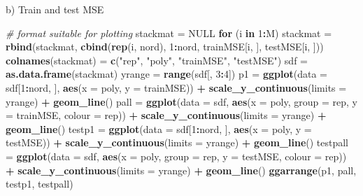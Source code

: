 \documentclass[ignorenonframetext,]{beamer}
\newenvironment{Shaded}{\begin{snugshade}}{\end{snugshade}}
\newcommand{\KeywordTok}[1]{\textcolor[rgb]{0.13,0.29,0.53}{\textbf{#1}}}
\newcommand{\DataTypeTok}[1]{\textcolor[rgb]{0.13,0.29,0.53}{#1}}
\newcommand{\DecValTok}[1]{\textcolor[rgb]{0.00,0.00,0.81}{#1}}
\newcommand{\StringTok}[1]{\textcolor[rgb]{0.31,0.60,0.02}{#1}}
\newcommand{\CommentTok}[1]{\textcolor[rgb]{0.56,0.35,0.01}{\textit{#1}}}
\newcommand{\OtherTok}[1]{\textcolor[rgb]{0.56,0.35,0.01}{#1}}
\newcommand{\ControlFlowTok}[1]{\textcolor[rgb]{0.13,0.29,0.53}{\textbf{#1}}}
\newcommand{\OperatorTok}[1]{\textcolor[rgb]{0.81,0.36,0.00}{\textbf{#1}}}
\newcommand{\NormalTok}[1]{#1}
\begin{document}
\begin{frame}[fragile]
\begin{block}{b) Train and test MSE}
\begin{Shaded}
\begin{Highlighting}[]
\CommentTok{# format suitable for plotting}
\NormalTok{stackmat =}\StringTok{ }\OtherTok{NULL}
\ControlFlowTok{for}\NormalTok{ (i }\ControlFlowTok{in} \DecValTok{1}\OperatorTok{:}\NormalTok{M) stackmat =}\StringTok{ }\KeywordTok{rbind}\NormalTok{(stackmat, }\KeywordTok{cbind}\NormalTok{(}\KeywordTok{rep}\NormalTok{(i, nord), }\DecValTok{1}\OperatorTok{:}\NormalTok{nord, }
\NormalTok{    trainMSE[i, ], testMSE[i, ]))}
\KeywordTok{colnames}\NormalTok{(stackmat) =}\StringTok{ }\KeywordTok{c}\NormalTok{(}\StringTok{"rep"}\NormalTok{, }\StringTok{"poly"}\NormalTok{, }\StringTok{"trainMSE"}\NormalTok{, }\StringTok{"testMSE"}\NormalTok{)}
\NormalTok{sdf =}\StringTok{ }\KeywordTok{as.data.frame}\NormalTok{(stackmat)}
\NormalTok{yrange =}\StringTok{ }\KeywordTok{range}\NormalTok{(sdf[, }\DecValTok{3}\OperatorTok{:}\DecValTok{4}\NormalTok{])}
\NormalTok{p1 =}\StringTok{ }\KeywordTok{ggplot}\NormalTok{(}\DataTypeTok{data =}\NormalTok{ sdf[}\DecValTok{1}\OperatorTok{:}\NormalTok{nord, ], }\KeywordTok{aes}\NormalTok{(}\DataTypeTok{x =}\NormalTok{ poly, }\DataTypeTok{y =}\NormalTok{ trainMSE)) }\OperatorTok{+}\StringTok{ }\KeywordTok{scale_y_continuous}\NormalTok{(}\DataTypeTok{limits =}\NormalTok{ yrange) }\OperatorTok{+}\StringTok{ }
\StringTok{    }\KeywordTok{geom_line}\NormalTok{()}
\NormalTok{pall =}\StringTok{ }\KeywordTok{ggplot}\NormalTok{(}\DataTypeTok{data =}\NormalTok{ sdf, }\KeywordTok{aes}\NormalTok{(}\DataTypeTok{x =}\NormalTok{ poly, }\DataTypeTok{group =}\NormalTok{ rep, }\DataTypeTok{y =}\NormalTok{ trainMSE, }\DataTypeTok{colour =}\NormalTok{ rep)) }\OperatorTok{+}\StringTok{ }
\StringTok{    }\KeywordTok{scale_y_continuous}\NormalTok{(}\DataTypeTok{limits =}\NormalTok{ yrange) }\OperatorTok{+}\StringTok{ }\KeywordTok{geom_line}\NormalTok{()}
\NormalTok{testp1 =}\StringTok{ }\KeywordTok{ggplot}\NormalTok{(}\DataTypeTok{data =}\NormalTok{ sdf[}\DecValTok{1}\OperatorTok{:}\NormalTok{nord, ], }\KeywordTok{aes}\NormalTok{(}\DataTypeTok{x =}\NormalTok{ poly, }\DataTypeTok{y =}\NormalTok{ testMSE)) }\OperatorTok{+}\StringTok{ }\KeywordTok{scale_y_continuous}\NormalTok{(}\DataTypeTok{limits =}\NormalTok{ yrange) }\OperatorTok{+}\StringTok{ }
\StringTok{    }\KeywordTok{geom_line}\NormalTok{()}
\NormalTok{testpall =}\StringTok{ }\KeywordTok{ggplot}\NormalTok{(}\DataTypeTok{data =}\NormalTok{ sdf, }\KeywordTok{aes}\NormalTok{(}\DataTypeTok{x =}\NormalTok{ poly, }\DataTypeTok{group =}\NormalTok{ rep, }\DataTypeTok{y =}\NormalTok{ testMSE, }
    \DataTypeTok{colour =}\NormalTok{ rep)) }\OperatorTok{+}\StringTok{ }\KeywordTok{scale_y_continuous}\NormalTok{(}\DataTypeTok{limits =}\NormalTok{ yrange) }\OperatorTok{+}\StringTok{ }\KeywordTok{geom_line}\NormalTok{()}
\KeywordTok{ggarrange}\NormalTok{(p1, pall, testp1, testpall)}
\end{Highlighting}
\end{Shaded}


\end{block}
\end{frame}
\end{document}
